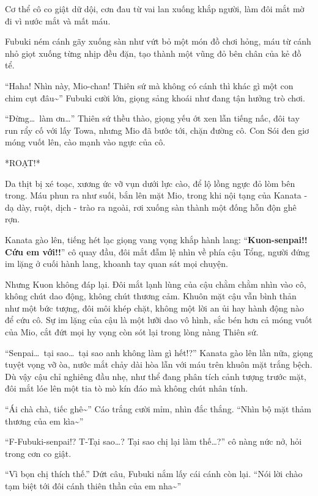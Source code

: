 \documentclass[../main.tex]{subfiles}
\begin{document}
Cơ thể cô co giật dữ dội, cơn đau từ vai lan xuống khắp người, làm đôi mắt mờ đi vì nước mắt và mất máu.

Fubuki ném cánh gãy xuống sàn như vứt bỏ một món đồ chơi hỏng, máu từ cánh nhỏ giọt xuống từng nhịp đều đặn, tạo thành một vũng đỏ bên chân của kẻ đồ tể.

``Haha! Nhìn này, Mio-chan! Thiên sứ mà không có cánh thì khác gì một con chim cụt đâu\~{}'' Fubuki cười lớn, giọng sảng khoái như đang tận hưởng trò chơi.

``Đừng\dots\ làm ơn\dots'' Thiên sứ thều thào, giọng yếu ớt xen lẫn tiếng nấc, đôi tay run rẩy cố với lấy Towa, nhưng Mio đã bước tới, chặn đường cô. Con Sói đen giơ móng vuốt lên, cào mạnh vào ngực của cô.

*ROẠT!*

Da thịt bị xé toạc, xương ức vỡ vụn dưới lực cào, để lộ lồng ngực đỏ lòm bên trong. Máu phun ra như suối, bắn lên mặt Mio, trong khi nội tạng của Kanata - dạ dày, ruột, dịch - trào ra ngoài, rơi xuống sàn thành một đống hỗn độn ghê rợn.

Kanata gào lên, tiếng hét lạc giọng vang vọng khắp hành lang: ``\textbf{Kuon-senpai!! Cứu em với!!}'' cô quay đầu, đôi mắt đẫm lệ nhìn về phía cậu Tổng, người đứng im lặng ở cuối hành lang, khoanh tay quan sát mọi chuyện.

Nhưng Kuon không đáp lại. Đôi mắt lạnh lùng của cậu chằm chằm nhìn vào cô, không chút dao động, không chút thương cảm. Khuôn mặt cậu vẫn bình thản như một bức tượng, đôi môi khép chặt, không một lời an ủi hay hành động nào để cứu cô. Sự im lặng của cậu là một lưỡi dao vô hình, sắc bén hơn cả móng vuốt của Mio, cắt đứt mọi hy vọng còn sót lại trong lòng nàng Thiên sứ.

``Senpai\dots\ tại sao\dots\ tại sao anh không làm gì hết!?'' Kanata gào lên lần nữa, giọng tuyệt vọng vỡ òa, nước mắt chảy dài hòa lẫn với máu trên khuôn mặt trắng bệch. Dù vậy cậu chỉ nghiêng đầu nhẹ, như thể đang phân tích cảnh tượng trước mặt, đôi mắt lóe lên một tia tò mò kín đáo mà không chút nhân tính.

``Ái chà chà, tiếc ghê\~{}'' Cáo trắng cười mỉm, nhìn đắc thắng. ``Nhìn bộ mặt thảm thương của em kìa\~{}''

``F-Fubuki-senpai!? T-Tại sao\dots? Tại sao chị lại làm thế\dots?'' cô nàng nức nở, hỏi trong cơn co giật.

``Vì bọn chị thích thế.'' Dứt câu, Fubuki nắm lấy cái cánh còn lại. ``Nói lời chào tạm biệt tới đôi cánh thiên thần của em nha\~{}''
\end{document}
